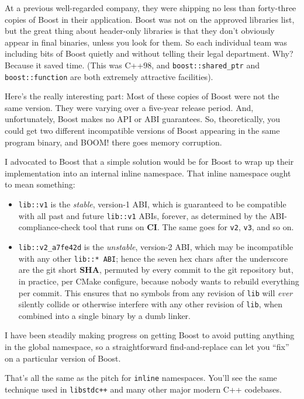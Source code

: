 At a previous well-regarded company, they were shipping no less than
forty-three copies of Boost in their application. Boost was not on the
approved libraries list, but the great thing about header-only libraries
is that they don't obviously appear in final binaries, unless you look
for them. So each individual team was including bits of Boost quietly
and without telling their legal department. Why? Because it saved time.
(This was C++98, and \texttt{boost::shared\_ptr} and
\texttt{boost::function} are both extremely attractive facilities).

Here's the really interesting part: Most of these copies of Boost were
not the same version. They were varying over a five-year release period.
And, unfortunately, Boost makes no API or ABI guarantees. So,
theoretically, you could get two different incompatible versions of
Boost appearing in the same program binary, and BOOM! there goes memory
corruption.

I advocated to Boost that a simple solution would be for Boost to wrap
up their implementation into an internal inline namespace. That inline
namespace ought to mean something:
\begin{itemize}
\item{\texttt{lib::v1} is the \emph{stable}, version-1 ABI, which is guaranteed to be compatible with all past and future \texttt{lib::v1} ABIs, forever, as determined by the ABI-compliance-check tool that runs on \textbf{CI}. The same goes for \texttt{v2}, \texttt{v3}, and so on.}
\item{\texttt{lib::v2\_a7fe42d} is the \emph{unstable}, version-2 ABI, which may be incompatible with any other \texttt{lib::*}~\texttt{ABI}; hence the seven hex chars after the underscore are the git short \textbf{SHA}, permuted by every commit to the git repository but, in practice, per CMake configure, because nobody wants to rebuild everything per commit. This ensures that no symbols from any revision of \texttt{lib} will \emph{ever} silently collide or otherwise interfere with any other revision of \texttt{lib}, when combined into a single binary by a dumb linker.}
\end{itemize}

I have been steadily making progress on getting Boost to avoid putting
anything in the global namespace, so a straightforward find-and-replace
can let you ``fix'' on a particular version of Boost.

That's all the same as the pitch for \texttt{inline} namespaces. You'll
see the same technique used in \texttt{libstdc++} and many other major modern C++
codebases.

